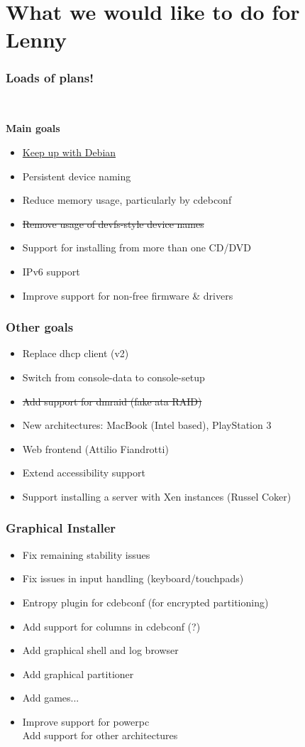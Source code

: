 \documentclass{beamer}
\begin{document}
\section{What we would like to do for Lenny}

\begin{frame}
  \frametitle{Loads of plans!}

	\ 

	\textbf{Main goals}

	\begin{itemize}
	\item
		\ul{Keep up with Debian}
	\item
		Persistent device naming
	\item
		Reduce memory usage, particularly by cdebconf
	\item
		\st{Remove usage of devfs-style device names}
	\item
		Support for installing from more than one CD/DVD
	\item
		IPv6 support
	\item
		Improve support for non-free firmware \& drivers
	\end{itemize}
\end{frame}

\begin{frame}
  \frametitle{Other goals}
	\begin{itemize}
	\item
		Replace dhcp client (v2)
	\item
		Switch from console-data to console-setup
	\item
		\st{Add support for dmraid (fake ata RAID)}
	\item
		New architectures: MacBook (Intel based), PlayStation 3
	\item
		Web frontend (Attilio Fiandrotti)
	\item
		Extend accessibility support
	\item
		Support installing a server with Xen instances (Russel Coker)
	\end{itemize}
\end{frame}

\begin{frame}
  \frametitle{Graphical Installer}
	\begin{itemize}
	\item
		Fix remaining stability issues
	\item
		Fix issues in input handling (keyboard/touchpads)
	\item
		Entropy plugin for cdebconf (for encrypted partitioning)
	\item
		Add support for columns in cdebconf (?)
	\item
		Add graphical shell and log browser
	\item
		Add graphical partitioner
	\item
		Add games...
	\item
		Improve support for powerpc \\
		Add support for other architectures
	\end{itemize}
\end{frame}
\end{document}

